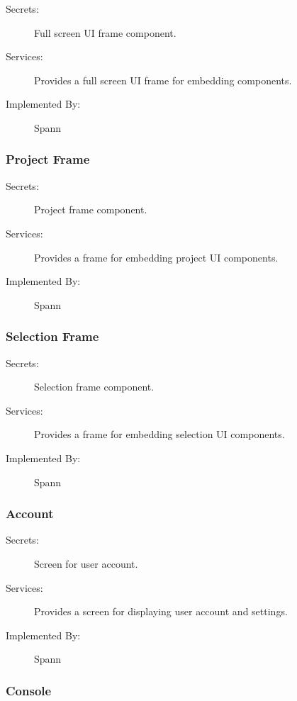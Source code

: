\documentclass[12pt, titlepage]{article}
\begin{document}
\begin{description}
\item[Secrets:] Full screen UI frame component.
\item[Services:] Provides a full screen UI frame for embedding components.
\item[Implemented By:] Spann
\end{description}

\subsubsection{Project Frame} \label{mdProjectFrame}

\begin{description}
\item[Secrets:] Project frame component.
\item[Services:] Provides a frame for embedding project UI components.
\item[Implemented By:] Spann
\end{description}

\subsubsection{Selection Frame} \label{mdSelectionFrame}

\begin{description}
\item[Secrets:] Selection frame component.
\item[Services:] Provides a frame for embedding selection UI components.
\item[Implemented By:] Spann
\end{description}

\subsubsection{Account} \label{mdAccount}

\begin{description}
\item[Secrets:] Screen for user account.
\item[Services:] Provides a screen for displaying user account and settings.
\item[Implemented By:] Spann
\end{description}

\subsubsection{Console} \label{mdConsole} 
\end{document}

